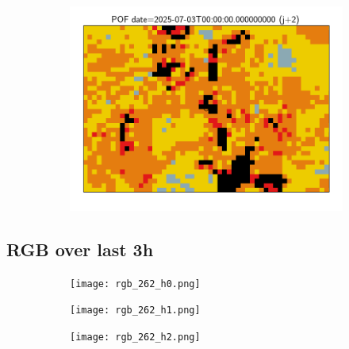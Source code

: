 \documentclass{article}
\begin{document}
\begin{figure}[H]
\begin{subfigure}[b]{0.31\textwidth}
    \end{subfigure}
    \begin{subfigure}[b]{0.36\textwidth}
        \centering
        \includegraphics[width=0.85\linewidth]{pof_262_j2.png} %
    \end{subfigure}
\end{figure}


\vspace{-1em}
\subsection*{RGB over last 3h}
\vspace{-1em}
\begin{figure}[H]
    \centering
    \begin{subfigure}[b]{0.32\textwidth}
        \centering
        \texttt{[image: rgb\_262\_h0.png]} %
    \end{subfigure}
    \begin{subfigure}[b]{0.32\textwidth}
        \centering
        \texttt{[image: rgb\_262\_h1.png]} %
    \end{subfigure}
    \begin{subfigure}[b]{0.32\textwidth}
        \centering
        \texttt{[image: rgb\_262\_h2.png]} %
    \end{subfigure}
\end{figure}
\end{document}
